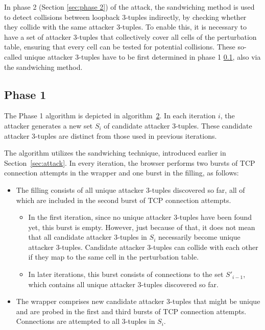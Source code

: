 \documentclass[twocolumn]{report}
\begin{document}
In phase 2 (Section \ref{sec:phase 2}) of the attack, the sandwiching method is used to detect collisions between loopback 3-tuples indirectly, by checking whether they collide with the same attacker 3-tuples. To enable this, it is necessary to have a set of attacker 3-tuples that collectively cover all cells of the perturbation table, ensuring that every cell can be tested for potential collisions. These so-called \alert{unique attacker 3-tuples} have to be first determined in phase 1 \ref{sec:phase 1}, also via the sandwiching method.

\subsection{Phase 1}
\label{sec:phase 1}

The Phase 1 algorithm is depicted in algorithm~\hyperref[alg:phase1]{2}. In each iteration $i$, the attacker generates a new set $S_i$ of \alert{candidate attacker 3-tuples}. These candidate attacker 3-tuples are distinct from those used in previous iterations.

The algorithm utilizes the \alert{sandwiching technique}, introduced earlier in Section~\ref{sec:attack}. In every iteration, the browser performs two bursts of TCP connection attempts in the wrapper and one burst in the filling, as follows:
\begin{itemize}
	\item The \alert{filling} consists of all \alert{unique attacker 3-tuples} discovered so far, all of which are included in the second burst of TCP connection attempts.
	\begin{itemize}
		\item In the first iteration, since no unique attacker 3-tuples have been found yet, this burst is \alert{empty}. However, just because of that, it does not mean that all candidate attacker 3-tuples in $S_i$ necessarily become unique attacker 3-tuples. Candidate attacker 3-tuples \alert{can collide with each other} if they map to the same cell in the perturbation table.
		\item In later iterations, this burst consists of connections to the set $S'_{i-1}$, which contains \alert{all unique attacker 3-tuples discovered so far}.
	\end{itemize}
	\item The \alert{wrapper} comprises new candidate attacker 3-tuples that might be unique and are probed in the first and third bursts of TCP connection attempts. Connections are attempted to all 3-tuples in $S_i$.
\end{itemize}
\end{document}
